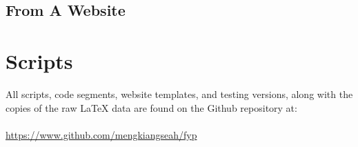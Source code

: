 \documentclass[main.tex]{subfiles}
\begin{document}
\subsection{From A Website}

\section{Scripts}\label{sec:appendix-scripts}
All scripts, code segments, website templates, and testing versions, along with the copies of the raw \LaTeX{} data are found on the Github repository at:
\\\\
\url{https://www.github.com/mengkiangseah/fyp}
\end{document}
